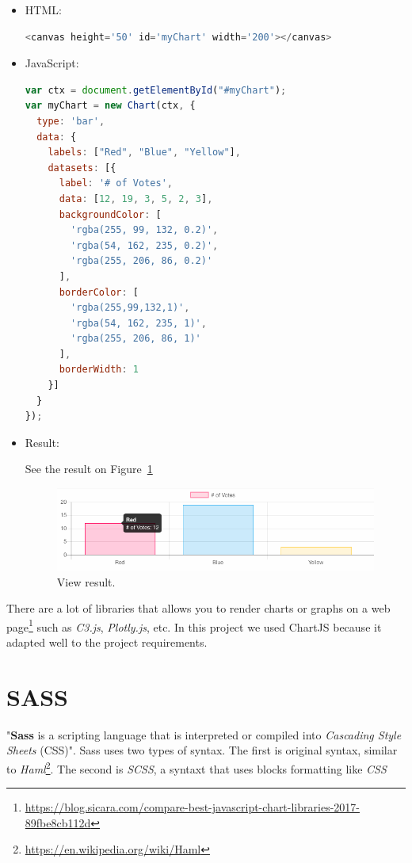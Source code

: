 \documentclass[a4paper, 12pt, english]{book}
\begin{document}
\begin{itemize}
    \item HTML:
        \begin{lstlisting}[language=javascript]
<canvas height='50' id='myChart' width='200'></canvas>
        \end{lstlisting}
    \item JavaScript:
        \begin{lstlisting}[language=javascript]
var ctx = document.getElementById("#myChart");
var myChart = new Chart(ctx, {
  type: 'bar',
  data: {
    labels: ["Red", "Blue", "Yellow"],
    datasets: [{
      label: '# of Votes',
      data: [12, 19, 3, 5, 2, 3],
      backgroundColor: [
        'rgba(255, 99, 132, 0.2)',
        'rgba(54, 162, 235, 0.2)',
        'rgba(255, 206, 86, 0.2)'
      ],
      borderColor: [
        'rgba(255,99,132,1)',
        'rgba(54, 162, 235, 1)',
        'rgba(255, 206, 86, 1)'
      ],
      borderWidth: 1
    }]
  }
});
        \end{lstlisting}
    \item Result:

    See the result on Figure~\ref{fig:chartjs-result-example}
    \begin{figure}
      \centering
      \includegraphics[width=13cm, keepaspectratio]{img/chartjs-result-example}
      \caption{View result.}
      \label{fig:chartjs-result-example}
    \end{figure}
\end{itemize}

There are a lot of libraries that allows you to render charts or graphs on a web page\footnote{\url{https://blog.sicara.com/compare-best-javascript-chart-libraries-2017-89fbe8cb112d}} such as \textit{C3.js}, \textit{Plotly.js}, etc. In this project we used ChartJS because it adapted well to the project requirements.


\section{SASS}
\label{sec:sass}

"\textbf{Sass} is a scripting language that is interpreted or compiled into \textit{Cascading Style Sheets} (CSS)". Sass uses two types of syntax. The first is original syntax, similar to \textit{Haml}\footnote{\url{https://en.wikipedia.org/wiki/Haml}}. The second is \textit{SCSS}, a syntaxt that uses blocks formatting like \textit{CSS}
\end{document}
